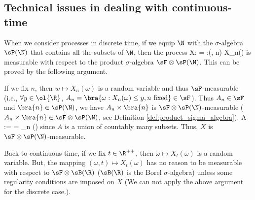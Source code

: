 \subsection{Technical issues in dealing with continuous-time}

When we consider processes in discrete time, if we equip $\N$ with the $\sigma$-algebra $\sP(\N)$ that contains all the subsets of $\N$, then the process
\be
X:\Omega \times\N\to \ol{\R} = \R\cup \bra{\pm \infty}:(\omega, n) \mapsto X_n(\omega)
\ee
is measurable with respect to the product $\sigma$-algebra $\sF\otimes \sP(\N)$. This can be proved by the following argument.

If we fix $n$, then $w\mapsto X_n(\omega)$ is a random variable and thus $\sF$-measurable (i.e., $\forall y\in \ol{\R}$, $A_n = \bra{\omega:X_n(\omega) \leq y, n\text{ fixed}} \in \sF$). Thus $A_n \in \sF$ and $\bra{n} \in \sP(\N)$, we have $A_n\times \bra{n}$ is $\sF\otimes \sP(\N)$-measurable ($A_n\times \bra{n} \in \sF\otimes \sP(\N)$, see Definition \ref{def:product_sigma_algebra}). %
\be
A :=  = \bigcup_{n} \in  \sF\otimes \sP(\N)
\ee
since $A$ is a union of countably many subsets. Thus, $X$ is $\sF\otimes \sP(\N)$-measurable.




Back to continuous time, if we fix $t \in\R^{++}$, then $\omega \mapsto X_t(\omega)$ is a random variable. But, the mapping $(\omega,t) \mapsto X_t(\omega)$ has no reason to be measurable with respect to $\sF \otimes \sB(\R)$ ($\sB(\R)$ is the Borel $\sigma$-algebra) unless some regularity conditions are imposed on $X$ (We can not apply the above argument for the discrete case.).

